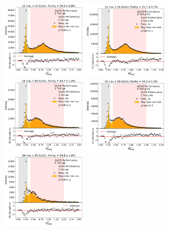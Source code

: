 \begin{figure}[h]
\center
\includegraphics[width=0.38\textwidth]{Purity/bf-example-pp-cluster_Lambda-12-15.pdf}
\includegraphics[width=0.38\textwidth]{Purity/bf-example-p-Pb-cluster_Lambda-12-15.pdf}
\\
\includegraphics[width=0.38\textwidth]{Purity/bf-example-pp-cluster_Lambda-15-20.pdf}
\includegraphics[width=0.38\textwidth]{Purity/bf-example-p-Pb-cluster_Lambda-15-20.pdf}
\includegraphics[width=0.38\textwidth]{Purity/bf-example-pp-cluster_Lambda-20-25.pdf}

\end{figure}

